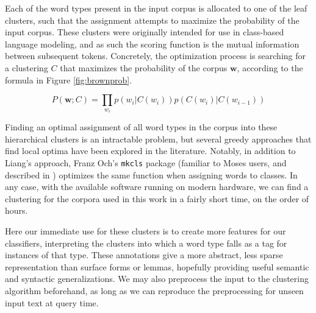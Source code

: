 Each of the word types present in the input corpus is allocated to one of the
leaf clusters, such that the assignment attempts to maximize the probability of
the input corpus.  These clusters were originally intended for use in
class-based language modeling, and as such the scoring function is the mutual
information between subsequent tokens. Concretely, the optimization process is
searching for a clustering $C$ that maximizes the probability of the corpus
$\boldsymbol{w}$, according to the formula in Figure \ref{fig:brownprob}.

\begin{figure*}

  \begin{equation} \label{eq:brownclassprob}
  P(\boldsymbol{w}; C) = \prod_{w_i} p(w_i | C(w_i)) p(C(w_i) | C(w_{i-1}))
  \end{equation}

  \caption{The Brown clustering expression for the probability of a corpus with
  a specific clustering $C$. It is the product, for each token, of the
  probability of that token given its cluster, and the probability of that
  current cluster given the previous cluster. This is analogous to the
  ``emission" and ``transition" probabilities used in an HMM-based tagger.}
  \label{fig:brownprob}
\end{figure*}

Finding an optimal assignment of all word types in the corpus into these
hierarchical clusters is an intractable problem, but several greedy approaches
that find local optima have been explored in the literature.  Notably, in
addition to Liang's approach, Franz Och's \texttt{mkcls} package (familiar to
Moses users, and described in \cite{och1999efficient}) optimizes the same
function when assigning words to classes. In any case, with the available
software running on modern hardware, we can find a clustering for the corpora
used in this work in a fairly short time, on the order of hours.

Here our immediate use for these clusters is to create more features for our
classifiers, interpreting the clusters into which a word type falls as a tag
for instances of that type. These annotations give a more abstract, less sparse
representation than surface forms or lemmas, hopefully providing useful
semantic and syntactic generalizations. We may also preprocess the input to
the clustering algorithm beforehand, as long as we can reproduce the
preprocessing for unseen input text at query time.

